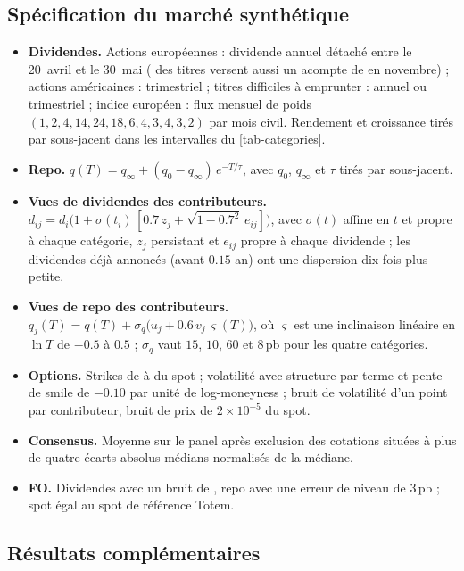 \subsection{Spécification du marché synthétique}
\begin{itemize}
\item \textbf{Dividendes.} Actions européennes : dividende annuel détaché entre le 20~avril et le 30~mai ( des
titres versent aussi un acompte de  en novembre) ; actions américaines : trimestriel ; titres difficiles à
emprunter : annuel ou trimestriel ; indice européen : flux mensuel de poids $(1, 2, 4, 14, 24, 18, 6, 4, 3, 4, 3, 2)$
par mois civil. Rendement et croissance tirés par sous-jacent dans les intervalles du \cref{tab-categories}.
\item \textbf{Repo.} $q(T)=q_\infty+(q_0-q_\infty)\,e^{-T/\tau}$, avec $q_0$, $q_\infty$ et $\tau$ tirés par sous-jacent.
\item \textbf{Vues de dividendes des contributeurs.}
$d_{ij}=d_i\bigl(1+\sigma(t_i)\,[\num{0.7}\,z_j+\sqrt{1-\num{0.7}^2}\,e_{ij}]\bigr)$, avec $\sigma(t)$ affine en $t$ et
propre à chaque catégorie, $z_j$ persistant et $e_{ij}$ propre à chaque dividende ; les dividendes déjà annoncés
(avant $\num{0.15}$ an) ont une dispersion dix fois plus petite.
\item \textbf{Vues de repo des contributeurs.} $q_j(T)=q(T)+\sigma_q\bigl(u_j+\num{0.6}\,v_j\,\varsigma(T)\bigr)$, où
$\varsigma$ est une inclinaison linéaire en $\ln T$ de $\num{-0.5}$ à $\num{0.5}$ ; $\sigma_q$ vaut $15$, $10$, $60$ et
$8$\,pb pour les quatre catégories.
\item \textbf{Options.} Strikes de  à  du spot ; volatilité avec structure par terme et pente de
smile de $\num{-0.10}$ par unité de log-moneyness ; bruit de volatilité d'un point par contributeur, bruit de prix de
$2\times10^{-5}$ du spot.
\item \textbf{Consensus.} Moyenne sur le panel après exclusion des cotations situées à plus de quatre écarts absolus
médians normalisés de la médiane.
\item \textbf{FO.} Dividendes avec un bruit de , repo avec une erreur de niveau de $3$\,pb ; spot égal au spot de
référence Totem.
\end{itemize}

\subsection{Résultats complémentaires}\label{app-results}
\begin{table}[H]
\centering
\caption{Aire sous la courbe ROC par rapport aux sous-jacents sains (qualité du classement, indépendante du seuil).}
\label{tab-auc}

\end{table}

